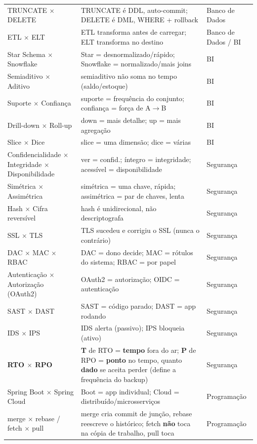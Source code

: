 \begin{longtable}{@{}p{3.3cm}p{6.1cm}p{2.6cm}@{}}
TRUNCATE $\times$ DELETE & TRUNCATE é DDL, auto-commit; DELETE é DML, WHERE + rollback & Banco de Dados \\
ETL $\times$ ELT & ETL transforma antes de carregar; ELT transforma no destino & Banco de Dados / BI \\
Star Schema $\times$ Snowflake & Star = desnormalizado/rápido; Snowflake = normalizado/mais joins & BI \\
Semiaditivo $\times$ Aditivo & semiaditivo não soma no tempo (saldo/estoque) & BI \\
Suporte $\times$ Confiança & suporte = frequência do conjunto; confiança = força de A$\to$B & BI \\
Drill-down $\times$ Roll-up & down = mais detalhe; up = mais agregação & BI \\
Slice $\times$ Dice & slice = uma dimensão; dice = várias & BI \\
Confidencialidade $\times$ Integridade $\times$ Disponibilidade & ver = confid.; íntegro = integridade; acessível = disponibilidade & Segurança \\
Simétrica $\times$ Assimétrica & simétrica = uma chave, rápida; assimétrica = par de chaves, lenta & Segurança \\
Hash $\times$ Cifra reversível & hash é unidirecional, não descriptografa & Segurança \\
SSL $\times$ TLS & TLS sucedeu e corrigiu o SSL (nunca o contrário) & Segurança \\
DAC $\times$ MAC $\times$ RBAC & DAC = dono decide; MAC = rótulos do sistema; RBAC = por papel & Segurança \\
Autenticação $\times$ Autorização (OAuth2) & OAuth2 = autorização; OIDC = autenticação & Segurança \\
SAST $\times$ DAST & SAST = código parado; DAST = app rodando & Segurança \\
IDS $\times$ IPS & IDS alerta (passivo); IPS bloqueia (ativo) & Segurança \\
\textbf{RTO $\times$ RPO} & \textbf{T} de RTO = \textbf{tempo} fora do ar; \textbf{P} de RPO = \textbf{ponto} no tempo, quanto \textbf{dado} se aceita perder (define a frequência do backup) & Segurança \\
Spring Boot $\times$ Spring Cloud & Boot = app individual; Cloud = distribuído/microsserviços & Programação \\
merge $\times$ rebase / fetch $\times$ pull & merge cria commit de junção, rebase reescreve o histórico; fetch \textbf{não} toca na cópia de trabalho, pull toca & Programação \\

\end{longtable}
